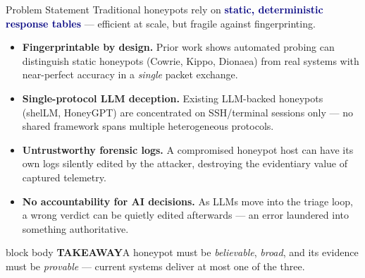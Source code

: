 \documentclass[aspectratio=169,11pt]{beamer}
\newcommand{\hl}[1]{\textcolor{navy}{\textbf{#1}}}
\newcommand{\takeaway}[1]{%
  \vspace{3pt}%
  \begin{beamercolorbox}[wd=\dimexpr\textwidth-10pt\relax,sep=5pt,rounded=true]{block body}%
    {\color{navy}\bfseries\scriptsize TAKEAWAY\;\;}{\scriptsize #1}%
  \end{beamercolorbox}}
\begin{document}
\begin{frame}{Problem Statement}
  \footnotesize
  Traditional honeypots rely on \hl{static, deterministic response tables} --- efficient at scale,
  but fragile against fingerprinting.
  \vspace{3pt}
  \begin{itemize}\setlength\itemsep{3pt}
    \item \textbf{Fingerprintable by design.} Prior work shows automated probing can distinguish
      static honeypots (Cowrie, Kippo, Dionaea) from real systems with near-perfect accuracy
      in a \emph{single} packet exchange.
    \item \textbf{Single-protocol LLM deception.} Existing LLM-backed honeypots (shelLM,
      HoneyGPT) are concentrated on SSH/terminal sessions only --- no shared framework
      spans multiple heterogeneous protocols.
    \item \textbf{Untrustworthy forensic logs.} A compromised honeypot host can have its own
      logs silently edited by the attacker, destroying the evidentiary value of captured telemetry.
    \item \textbf{No accountability for AI decisions.} As LLMs move into the triage loop, a wrong
      verdict can be quietly edited afterwards --- an error laundered into something authoritative.
  \end{itemize}
  \takeaway{A honeypot must be \emph{believable}, \emph{broad}, and its evidence must be \emph{provable} --- current systems deliver at most one of the three.}
\end{frame}
\end{document}
